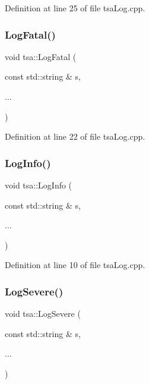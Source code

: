 Definition at line 25 of file tsa\+Log.\+cpp.

\mbox{\label{namespacetsa_a0314b9c30387b942a5de0ec7ff3026e3}} 
\subsubsection{\texorpdfstring{Log\+Fatal()}{LogFatal()}}
{\footnotesize\ttfamily void tsa\+::\+Log\+Fatal (\begin{DoxyParamCaption}\item[{const std\+::string \&}]{s,  }\item[{}]{... }\end{DoxyParamCaption})}



Definition at line 22 of file tsa\+Log.\+cpp.

\mbox{\label{namespacetsa_a08952ac2e7ac6e538c83692501aed4e7}} 
\subsubsection{\texorpdfstring{Log\+Info()}{LogInfo()}}
{\footnotesize\ttfamily void tsa\+::\+Log\+Info (\begin{DoxyParamCaption}\item[{const std\+::string \&}]{s,  }\item[{}]{... }\end{DoxyParamCaption})}



Definition at line 10 of file tsa\+Log.\+cpp.

\mbox{\label{namespacetsa_a3bce10382fbb41b48aca0e5b8afeb896}} 
\subsubsection{\texorpdfstring{Log\+Severe()}{LogSevere()}\hspace{0.1cm}{\footnotesize\ttfamily [1/2]}}
{\footnotesize\ttfamily void tsa\+::\+Log\+Severe (\begin{DoxyParamCaption}\item[{const std\+::string \&}]{s,  }\item[{}]{... }\end{DoxyParamCaption})}



